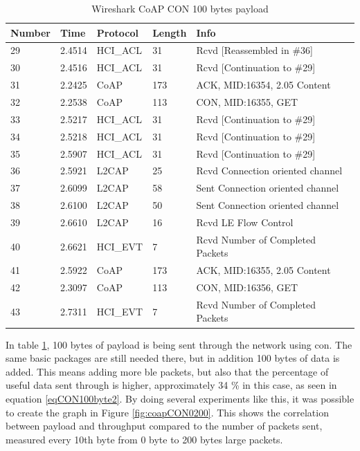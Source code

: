 \begin{table}[H]
\centering
\caption{Wireshark CoAP CON 100 bytes payload}
\label{coapCON100table}
\begin{tabular}{lllll}
Number & Time   & Protocol & Length & Info                             \\ \hline
29     & 2.4514 & HCI\_ACL & 31     & Rcvd {[}Reassembled in \#36{]}   \\
30     & 2.4516 & HCI\_ACL & 31     & Rcvd {[}Continuation to \#29{]}  \\
31     & 2.2425 & CoAP     & 173    & ACK, MID:16354, 2.05 Content     \\
32     & 2.2538 & CoAP     & 113    & CON, MID:16355, GET              \\
33     & 2.5217 & HCI\_ACL & 31     & Rcvd {[}Continuation to \#29{]}  \\
34     & 2.5218 & HCI\_ACL & 31     & Rcvd {[}Continuation to \#29{]}  \\
35     & 2.5907 & HCI\_ACL & 31     & Rcvd {[}Continuation to \#29{]}  \\
36     & 2.5921 & L2CAP    & 25     & Rcvd Connection oriented channel \\
37     & 2.6099 & L2CAP    & 58     & Sent Connection oriented channel \\
38     & 2.6100 & L2CAP    & 50     & Sent Connection oriented channel \\
39     & 2.6610 & L2CAP    & 16     & Rcvd LE Flow Control             \\
40     & 2.6621 & HCI\_EVT & 7      & Rcvd Number of Completed Packets \\
41     & 2.5922 & CoAP     & 173    & ACK, MID:16355, 2.05 Content     \\
42     & 2.3097 & CoAP     & 113    & CON, MID:16356, GET              \\ 
43     & 2.7311 & HCI\_EVT & 7      & Rcvd Number of Completed Packets \\ \hline
\end{tabular}
\end{table}

\noindent In table \ref{coapCON100table}, 100 bytes of \gls{payload} is being sent through the network using \gls{con}. The same basic packages are still needed there, but in addition 100 bytes of data is added. This means adding more \gls{ble} packets, but also that the percentage of useful data sent through is  higher, approximately 34 \% in this case, as seen in equation \ref{eqCON100byte2}. By doing several experiments like this, it was possible to create the graph in Figure \ref{fig:coapCON0200}. This shows the correlation between \gls{payload} and \gls{throughput} compared to the number of packets sent, measured every 10th byte from 0 byte to 200 bytes large packets. %

